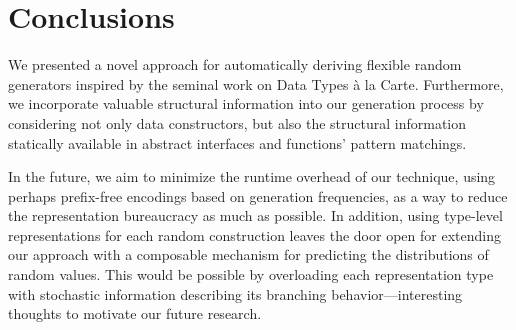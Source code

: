 \section{Conclusions}
\label{sec:conclusions}

We presented a novel approach for automatically deriving flexible random
generators inspired by the seminal work on Data Types \`a la Carte.
%
Furthermore, we incorporate valuable structural information into our generation
process by considering not only data constructors, but also the structural
information statically available in abstract interfaces and functions' pattern
matchings.
%


In the future, we aim to minimize the runtime overhead of our technique, using
perhaps prefix-free encodings based on generation frequencies, as a way to
reduce the representation bureaucracy as much as possible.
%
In addition, using type-level representations for each random construction
leaves the door open for extending our approach with a composable mechanism for
predicting the distributions of random values.
%
This would be possible by overloading each representation type with stochastic
information describing its branching behavior---interesting thoughts to motivate
our future research.

